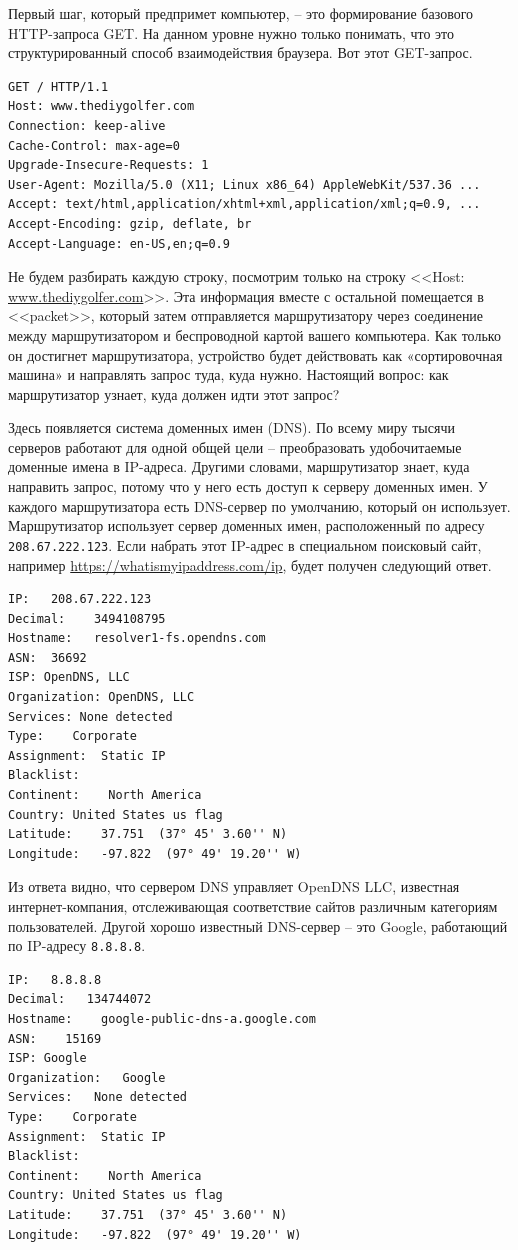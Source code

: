 \documentclass[a4paper,12pt,final,openany]{extbook}
\begin{document}
Первый шаг, который предпримет компьютер, -- это формирование базового
HTTP-запроса GET. На данном уровне нужно только
понимать, что это структурированный способ взаимодействия браузера. Вот
этот GET-запрос.
\begin{verbatim}
GET / HTTP/1.1
Host: www.thediygolfer.com
Connection: keep-alive
Cache-Control: max-age=0
Upgrade-Insecure-Requests: 1
User-Agent: Mozilla/5.0 (X11; Linux x86_64) AppleWebKit/537.36 ...
Accept: text/html,application/xhtml+xml,application/xml;q=0.9, ...
Accept-Encoding: gzip, deflate, br
Accept-Language: en-US,en;q=0.9
\end{verbatim}

Не будем разбирать каждую строку, посмотрим только на строку <<Host:
\href{http://www.thediygolfer.com}{www.thediygolfer.com}>>. Эта
информация вместе с остальной помещается в <<packet>>, который затем
отправляется маршрутизатору через соединение между маршрутизатором и
беспроводной картой вашего компьютера. Как только он достигнет
маршрутизатора, устройство будет действовать как «сортировочная машина»
и направлять запрос туда, куда нужно. Настоящий вопрос: как
маршрутизатор узнает, куда должен идти этот запрос?

Здесь появляется система доменных имен (DNS). По всему миру
тысячи серверов работают для одной общей цели -- преобразовать
удобочитаемые доменные имена в IP-адреса. Другими словами, маршрутизатор
знает, куда направить запрос, потому что у него есть доступ к серверу
доменных имен. У каждого маршрутизатора есть DNS-сервер по умолчанию,
который он использует. Маршрутизатор использует сервер доменных
имен, расположенный по адресу \texttt{208.67.222.123}. Если набрать этот
IP-адрес в специальном поисковый сайт, например
\url{https://whatismyipaddress.com/ip}, будет получен следующий ответ.
\begin{verbatim}
IP:   208.67.222.123
Decimal:    3494108795
Hostname:   resolver1-fs.opendns.com
ASN:  36692
ISP: OpenDNS, LLC
Organization: OpenDNS, LLC
Services: None detected
Type:    Corporate
Assignment:  Static IP
Blacklist:
Continent:    North America
Country: United States us flag
Latitude:    37.751  (37° 45' 3.60'' N)
Longitude:   -97.822  (97° 49' 19.20'' W)
\end{verbatim}

Из ответа видно, что сервером DNS управляет OpenDNS LLC, известная
интернет-компания, отслеживающая соответствие сайтов различным категориям пользователей.
Другой хорошо известный DNS-сервер -- это Google, работающий
по IP-адресу \texttt{8.8.8.8}.
\begin{verbatim}
IP:   8.8.8.8
Decimal:   134744072
Hostname:    google-public-dns-a.google.com
ASN:    15169
ISP: Google
Organization:   Google
Services:   None detected
Type:    Corporate
Assignment:  Static IP
Blacklist:
Continent:    North America
Country: United States us flag
Latitude:    37.751  (37° 45' 3.60'' N)
Longitude:   -97.822  (97° 49' 19.20'' W)
\end{verbatim}
\end{document}
